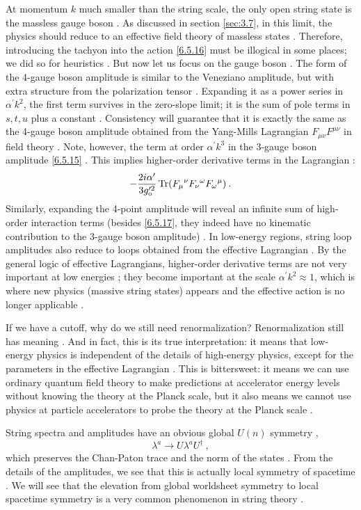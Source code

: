 At momentum $k$ much smaller than the string scale, the only open string state is the massless gauge boson . As discussed in section \ref{sec:3.7}, in this limit, the physics should reduce to an effective field theory of massless states . Therefore, introducing the tachyon into the action \eqref{6.5.16} must be illogical in some places; we did so for heuristics . But now let us focus on the gauge boson . The form of the 4-gauge boson amplitude is similar to the Veneziano amplitude, but with extra structure from the polarization tensor . Expanding it as a power series in $\alpha^{\prime} k^{2}$, the first term survives in the zero-slope limit; it is the sum of pole terms in $s, t, u$ plus a constant . Consistency will guarantee that it is exactly the same as the 4-gauge boson amplitude obtained from the Yang-Mills Lagrangian $F_{\mu \nu} F^{\mu\nu}$ in field theory . Note, however, the term at order $\alpha^{\prime} k^{3}$ in the 3-gauge boson amplitude \eqref{6.5.15} . This implies higher-order derivative terms in the Lagrangian :
\begin{equation}
	-\frac{2 i \alpha^{\prime}}{3 g_{\text{o}}^{\prime 2}} \operatorname{Tr}(F_{\mu}{}^{\nu} F_{\nu}{}^{\omega} F_{\omega}{}^{\mu}) \:. \label{6.5.17}
\end{equation}
Similarly, expanding the 4-point amplitude will reveal an infinite sum of high-order interaction terms (besides \eqref{6.5.17}, they indeed have no kinematic contribution to the 3-gauge boson amplitude) . In low-energy regions, string loop amplitudes also reduce to loops obtained from the effective Lagrangian . By the general logic of effective Lagrangians, higher-order derivative terms are not very important at low energies  ; they become important at the scale $\alpha^{\prime} k^{2} \approx 1$, which is where new physics (massive string states) appears and the effective action is no longer applicable .

If we have a cutoff, why do we still need renormalization? Renormalization still has meaning . And in fact, this is its true interpretation: it means that low-energy physics is independent of the details of high-energy physics, except for the parameters in the effective Lagrangian . This is bittersweet: it means we can use ordinary quantum field theory to make predictions at accelerator energy levels without knowing the theory at the Planck scale, but it also means we cannot use physics at particle accelerators to probe the theory at the Planck scale .

String spectra and amplitudes have an obvious global $U(n)$ symmetry ,
\begin{equation}
	\lambda^{a} \rightarrow U \lambda^{a} U^{\dagger} \:, \label{6.5.18}
\end{equation}
which preserves the Chan-Paton trace and the norm of the states . From the details of the amplitudes, we see that this is actually local symmetry of spacetime . We will see that the elevation from global worldsheet symmetry to local spacetime symmetry is a very common phenomenon in string theory .

